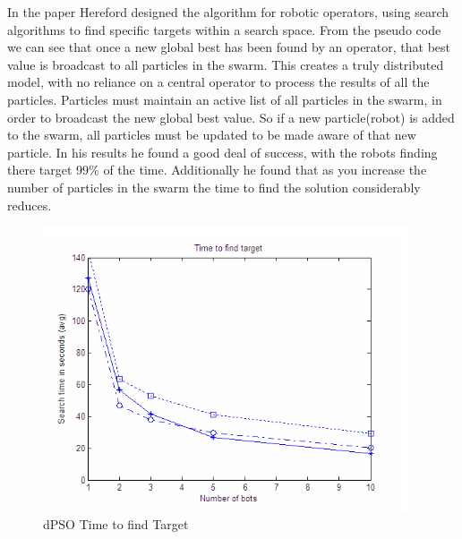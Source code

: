\documentclass[oneside,12pt]{book}
\begin{document}
In the paper Hereford designed the algorithm for robotic operators, using search algorithms to find specific targets within a search space. From the pseudo code we can see that once a new global best has been found by an operator, that best value is broadcast to all particles in the swarm. 
This creates a truly distributed model, with no reliance on a central operator to process the results of all the particles. Particles must maintain an active list of all particles in the swarm, in order to broadcast the new global best value. So if a new particle(robot) is added to the swarm, all particles must be updated to be made aware of that new particle. 
In his results he found a good deal of success, with the robots finding there target 99\% of the time. Additionally he found that as you increase the number of particles in the swarm the time to find the solution considerably reduces. 
\begin{figure}[H]
    \centering
    \includegraphics[scale=0.9]{Images/HerefordResults.png}
    \caption{dPSO Time to find Target \protect\cite{hereford_2006} }
    \label{fig:dPSO Time to find Target}
\end{figure}
\end{document}
